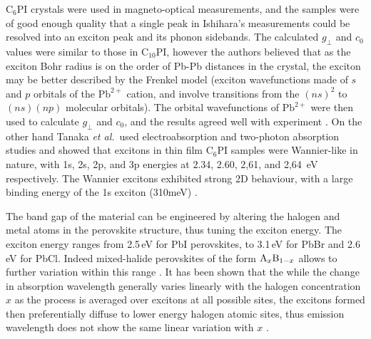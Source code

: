 $\textrm{C}_{6}$PI crystals were used in magneto-optical measurements, and the samples were of good enough quality that a single peak in Ishihara's measurements could be resolved into an exciton peak and its phonon sidebands. The calculated $g_{\bot}$ and $c_0$ values were similar to those in $\textrm{C}_{10}$PI, however the authors believed that as the exciton Bohr radius is on the order of Pb-Pb distances in the crystal, the exciton may be better described by the Frenkel model (exciton wavefunctions made of $s$ and $p$ orbitals of the $\textrm{Pb}^{2+}$ cation, and involve transitions from the $(ns)^2$ to $(ns)(np)$ molecular orbitals). The orbital wavefunctions of $\textrm{Pb}^{2+}$ were then used to calculate $g_{\bot}$ and $c_0$, and the results agreed well with experiment \cite{Kataoka1993}. On the other hand Tanaka \textit{et al.}\ used electroabsorption and two-photon absorption studies and showed that excitons in thin film $\textrm{C}_{6}$PI samples were Wannier-like in nature, with 1s, 2s, 2p, and 3p energies at 2.34, 2.60, 2,61, and 2,64~eV respectively. The Wannier excitons exhibited strong 2D behaviour, with a large binding energy of the 1s exciton (310meV) \cite{Tanaka2002}.

The band gap of the material can be engineered by altering the halogen and metal atoms in the perovskite structure, thus tuning the exciton energy. The exciton energy ranges from 2.5\,eV for PbI perovskites, to 3.1\,eV for PbBr and 2.6\,eV for PbCl. Indeed mixed-halide perovskites of the form $\textnormal{A}_x\textnormal{B}_{1-x}$ allows to further variation within this range \cite{Kitazawa1996, Kitazawa1997}. It has been shown that the while the change in absorption wavelength generally varies linearly with the halogen concentration $x$ as the process is averaged over excitons at all possible sites, the excitons formed then preferentially diffuse to lower energy halogen atomic sites, thus emission wavelength does not show the same linear variation with $x$ \cite{Ahmad2013}.


